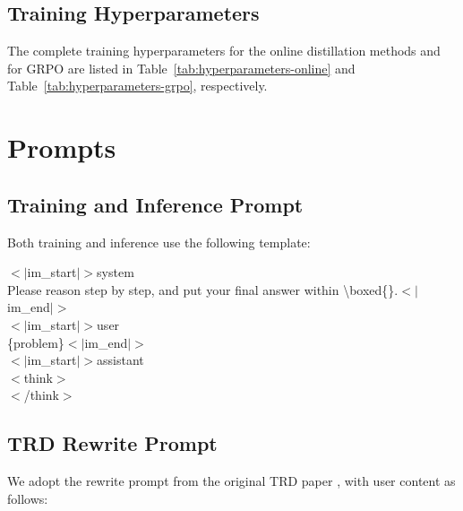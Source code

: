 \documentclass{article} %
\begin{document}
\subsection{Training Hyperparameters}\label{app:hyperparameters}

The complete training hyperparameters for the online distillation methods and for GRPO are listed in Table~\ref{tab:hyperparameters-online} and Table~\ref{tab:hyperparameters-grpo}, respectively.\par



\section{Prompts}\label{app:prompts}

\subsection{Training and Inference Prompt}\label{app:training-prompt}

Both training and inference use the following template:\par

\begin{promptbox}[title={Training and Inference Prompt}, breakable=false]
$<|$im\_start$|>$system\\
Please reason step by step, and put your final answer within \textbackslash boxed\{\}.$<|$im\_end$|>$\\
$<|$im\_start$|>$user\\
\{problem\}$<|$im\_end$|>$\\
$<|$im\_start$|>$assistant\\
$<$think$>$\\[\baselineskip]
$<$/think$>$
\end{promptbox}

\subsection{TRD Rewrite Prompt}\label{app:trd-prompt}

We adopt the rewrite prompt from the original TRD paper \citep{jiang2026trajectory}, with user content as follows:\par
\end{document}
